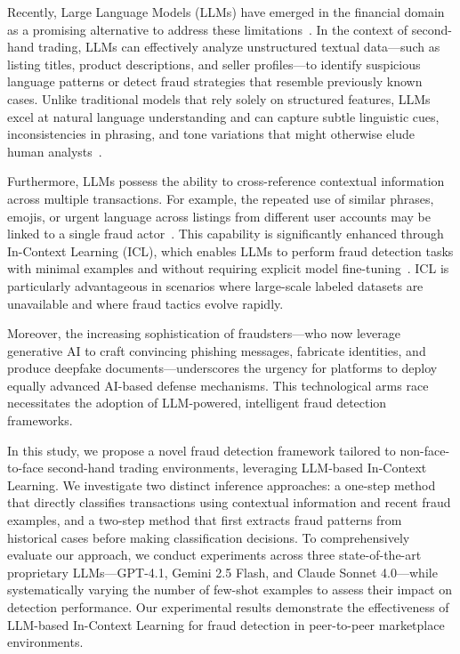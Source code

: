 \documentclass[sigconf]{acmart}
\begin{document}
Recently, Large Language Models (LLMs) have emerged in the financial domain as a promising alternative to address these limitations~\cite{huang2024ptp,huang2023,lee2025}. In the context of second-hand trading, LLMs can effectively analyze unstructured textual data—such as listing titles, product descriptions, and seller profiles—to identify suspicious language patterns or detect fraud strategies that resemble previously known cases. Unlike traditional models that rely solely on structured features, LLMs excel at natural language understanding and can capture subtle linguistic cues, inconsistencies in phrasing, and tone variations that might otherwise elude human analysts~\cite{cahyawijaya2024,wu2025why,agarwal2024}.

Furthermore, LLMs possess the ability to cross-reference contextual information across multiple transactions. For example, the repeated use of similar phrases, emojis, or urgent language across listings from different user accounts may be linked to a single fraud actor~\cite{pan2020}. This capability is significantly enhanced through In-Context Learning (ICL), which enables LLMs to perform fraud detection tasks with minimal examples and without requiring explicit model fine-tuning~\cite{zhao2024fewshing}. ICL is particularly advantageous in scenarios where large-scale labeled datasets are unavailable and where fraud tactics evolve rapidly.

Moreover, the increasing sophistication of fraudsters—who now leverage generative AI to craft convincing phishing messages, fabricate identities, and produce deepfake documents—underscores the urgency for platforms to deploy equally advanced AI-based defense mechanisms. This technological arms race necessitates the adoption of LLM-powered, intelligent fraud detection frameworks.

In this study, we propose a novel fraud detection framework tailored to non-face-to-face second-hand trading environments, leveraging LLM-based In-Context Learning. We investigate two distinct inference approaches: a one-step method that directly classifies transactions using contextual information and recent fraud examples, and a two-step method that first extracts fraud patterns from historical cases before making classification decisions. To comprehensively evaluate our approach, we conduct experiments across three state-of-the-art proprietary LLMs—GPT-4.1, Gemini 2.5 Flash, and Claude Sonnet 4.0—while systematically varying the number of few-shot examples to assess their impact on detection performance. Our experimental results demonstrate the effectiveness of LLM-based In-Context Learning for fraud detection in peer-to-peer marketplace environments.
\end{document}
